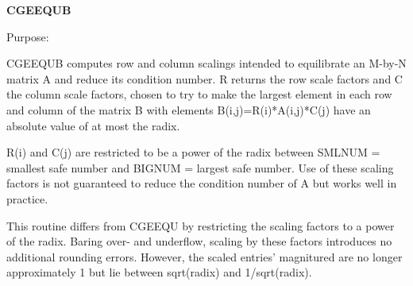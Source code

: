 {\bfseries C\+G\+E\+E\+Q\+U\+B} 

 \begin{DoxyParagraph}{Purpose\+: }
\begin{DoxyVerb} CGEEQUB computes row and column scalings intended to equilibrate an
 M-by-N matrix A and reduce its condition number.  R returns the row
 scale factors and C the column scale factors, chosen to try to make
 the largest element in each row and column of the matrix B with
 elements B(i,j)=R(i)*A(i,j)*C(j) have an absolute value of at most
 the radix.

 R(i) and C(j) are restricted to be a power of the radix between
 SMLNUM = smallest safe number and BIGNUM = largest safe number.  Use
 of these scaling factors is not guaranteed to reduce the condition
 number of A but works well in practice.

 This routine differs from CGEEQU by restricting the scaling factors
 to a power of the radix.  Baring over- and underflow, scaling by
 these factors introduces no additional rounding errors.  However, the
 scaled entries' magnitured are no longer approximately 1 but lie
 between sqrt(radix) and 1/sqrt(radix).\end{DoxyVerb}
 
\end{DoxyParagraph}

